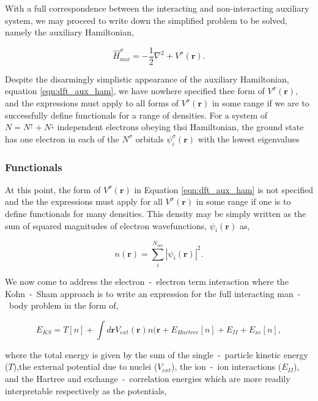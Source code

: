 With a full correspondence between the interacting and non-interacting auxiliary system, we may proceed to write down the simplified problem to be solved, namely the auxiliary Hamiltonian,

\begin{equation}
    \hat{H}^{\sigma}_{aux} = -\frac{1}{2}\nabla^{2} + V^{\sigma}(\textbf{r}).
    \label{eqn:dft_aux_ham}
\end{equation}

Despite the disarmingly simplistic appearance of the auxiliary Hamiltonian, equation \ref{eqn:dft_aux_ham}, we have nowhere specified thee form of $V^{\sigma}(\textbf{r})$, and the expressions must apply to all forms of $V^{\sigma}(\textbf{r})$ in some range if we are to successfully define functionals for a range of densities. For a system of $N= N^{\uparrow}+N^{\downarrow}$ independent electrons obeying thsi Hamiltonian, the ground state has one electron in each of the $N^{\sigma}$ orbitals $\psi_{i}^{\sigma}(\textbf{r})$ with the lowest eigenvalues 

\subsubsection{Functionals}
\label{sec:dft_funk}

At this point, the form of $ V^{\sigma}(\textbf{r})$ in Equation \ref{eqn:dft_aux_ham} is not specified and the the expressions must apply for all $ V^{\sigma}(\textbf{r})$ in some range if one is to define functionals for many densities. This density may be simply written as the sum of squared magnitudes of electron wavefunctions, $\psi_{i}(\textbf{r})$ as,

\begin{equation}
    n(\textbf{r}) = \sum_{i}^{N_{occ}}| \psi_{i}(\textbf{r}) |^{2}.
    \label{eqn:dft_dens}
\end{equation}

We now come to address the electron~-~electron term interaction where the Kohn~-~Sham approach is to write an expression for the full interacting man~-~body problem in the form of,

\begin{equation}
    E_{KS} = T[n] + \int d\textbf{r}V_{ext}(\textbf{r})n(\textbf{r} + E_{Hartree}[n] + E_{II} + E_{xc}[n],
    \label{eqn:dft_full_KS}
\end{equation}

where the total energy is given by the sum of the single~-~particle kinetic energy ($T$),the external potential due to nuclei ($V_{ext}$), the ion~-~ion interactions ($E_{II}$), and the Hartree and exchange~-~correlation energies which are more readily interpretable respectively as the potentials,

